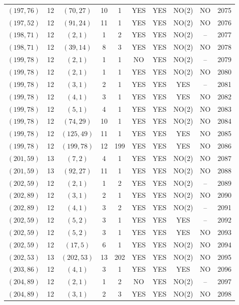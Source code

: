 \begin{longtable}{|c|c|c|c|c|c|c|c|c|c|}
$(197, 76)$ & 12 & $(70, 27)$ & 10 & 1 & YES & YES & NO(2) & NO & 2075\\
$(197, 52)$ & 12 & $(91, 24)$ & 11 & 1 & YES & YES & NO(2) & NO & 2076\\
$(198, 71)$ & 12 & $(2, 1)$ & 1 & 2 & YES & YES & NO(2) & -- & 2077\\
$(198, 71)$ & 12 & $(39, 14)$ & 8 & 3 & YES & YES & NO(2) & NO & 2078\\
$(199, 78)$ & 12 & $(2, 1)$ & 1 & 1 & NO & YES & NO(2) & -- & 2079\\
$(199, 78)$ & 12 & $(2, 1)$ & 1 & 1 & YES & YES & NO(2) & NO & 2080\\
$(199, 78)$ & 12 & $(3, 1)$ & 2 & 1 & YES & YES & YES & -- & 2081\\
$(199, 78)$ & 12 & $(4, 1)$ & 3 & 1 & YES & YES & YES & NO & 2082\\
$(199, 78)$ & 12 & $(5, 1)$ & 4 & 1 & YES & YES & NO(2) & NO & 2083\\
$(199, 78)$ & 12 & $(74, 29)$ & 10 & 1 & YES & YES & NO(2) & NO & 2084\\
$(199, 78)$ & 12 & $(125, 49)$ & 11 & 1 & YES & YES & YES & NO & 2085\\
$(199, 78)$ & 12 & $(199, 78)$ & 12 & 199 & YES & YES & YES & NO & 2086\\
$(201, 59)$ & 13 & $(7, 2)$ & 4 & 1 & YES & YES & NO(2) & NO & 2087\\
$(201, 59)$ & 13 & $(92, 27)$ & 11 & 1 & YES & YES & NO(2) & NO & 2088\\
$(202, 59)$ & 12 & $(2, 1)$ & 1 & 2 & YES & YES & NO(2) & -- & 2089\\
$(202, 89)$ & 12 & $(3, 1)$ & 2 & 1 & YES & YES & NO(2) & NO & 2090\\
$(202, 89)$ & 12 & $(4, 1)$ & 3 & 2 & YES & YES & NO(2) & -- & 2091\\
$(202, 59)$ & 12 & $(5, 2)$ & 3 & 1 & YES & YES & YES & -- & 2092\\
$(202, 59)$ & 12 & $(5, 2)$ & 3 & 1 & YES & YES & YES & NO & 2093\\
$(202, 59)$ & 12 & $(17, 5)$ & 6 & 1 & YES & YES & NO(2) & NO & 2094\\
$(202, 53)$ & 13 & $(202, 53)$ & 13 & 202 & YES & YES & NO(2) & NO & 2095\\
$(203, 86)$ & 12 & $(4, 1)$ & 3 & 1 & YES & YES & YES & NO & 2096\\
$(204, 89)$ & 12 & $(2, 1)$ & 1 & 2 & NO & YES & NO(2) & -- & 2097\\
$(204, 89)$ & 12 & $(3, 1)$ & 2 & 3 & YES & YES & NO(2) & NO & 2098\\

\end{longtable}
